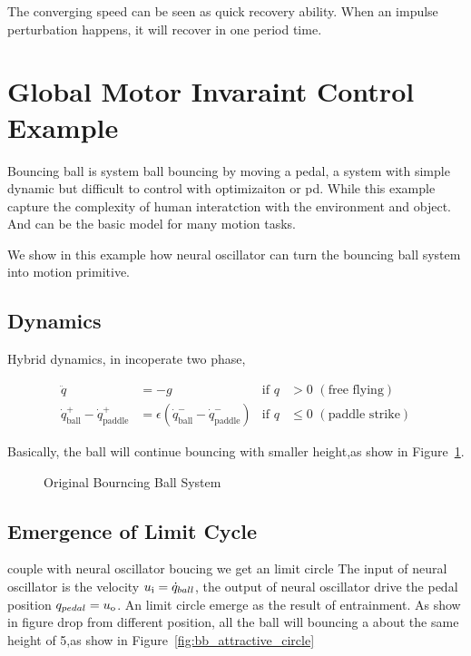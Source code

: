 The converging speed can be seen as quick recovery ability.
When an impulse perturbation happens, it will recover in one period time.


\section{Global Motor Invaraint Control Example}

Bouncing ball is system ball bouncing by moving a pedal, a system with simple dynamic but difficult to control with optimizaiton or pd. 
While this example capture the complexity of human interatction with the environment and object. 
And can be the basic model for many motion tasks.

We show in this example how neural oscillator can turn the bouncing ball system into motion primitive.
\subsection*{Dynamics}
Hybrid dynamics, in incoperate two phase, 
 

\begin{align}
\ddot{q}&=-g&\mathrm{if}\,\,q &> 0\,\,\mathrm{(free\,\,flying)} \nonumber\\
\dot{q}^{+}_{\mathrm{ball}} - \dot{q}^{+}_{\mathrm{paddle}} &=  \epsilon(\dot{q}^{-}_{\mathrm{ball}} - \dot{q}^{-}_{\mathrm{paddle}})&\mathrm{if}\,\,q &\leq 0\,\,\mathrm{(paddle\,\,strike)}\nonumber
\end{align}

Basically, the ball will continue bouncing with smaller height,as show in Figure~\ref{fig:bborg}.

\begin{figure}[h]
\begin{center}
	
\end{center}
\caption{Original Bourncing Ball System}
\label{fig:bborg}
\end{figure}



\subsection*{Emergence of Limit Cycle}
couple with neural oscillator boucing we get an limit circle
The input of neural oscillator is the velocity $u_{\mathrm{i}}=\dot{q}_{ball}$, the output of neural oscillator  drive the pedal position $q_{pedal}=u_{\mathrm{o}}$.
An limit circle emerge as the result of entrainment.
As show in figure drop from different position, all the ball will bouncing a about the same height of 5,as show in Figure~\ref{fig:bb_attractive_circle}

